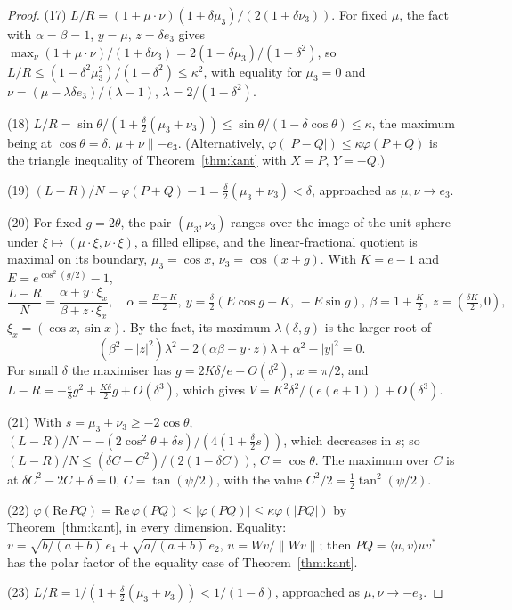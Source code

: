 \documentclass[11pt]{article}
\renewcommand{\Re}{\mathrm{Re}\,}
\theoremstyle{plain}
\theoremstyle{definition}
\theoremstyle{remark}
\begin{document}
\begin{proof}
(17) $L/R=(1+\mu\cdot\nu)(1+\delta\mu_3)/(2(1+\delta\nu_3))$. For fixed $\mu$, the fact with $\alpha=\beta=1$, $y=\mu$,
$z=\delta e_3$ gives $\max_\nu(1+\mu\cdot\nu)/(1+\delta\nu_3)=2(1-\delta\mu_3)/(1-\delta^2)$, so
$L/R\le(1-\delta^2\mu_3^2)/(1-\delta^2)\le\kappa^2$, with equality for $\mu_3=0$ and $\nu=(\mu-\lambda\delta e_3)/(\lambda-1)$,
$\lambda=2/(1-\delta^2)$.

(18) $L/R=\sin\theta/(1+\frac\delta2(\mu_3+\nu_3))\le\sin\theta/(1-\delta\cos\theta)\le\kappa$, the maximum being at
$\cos\theta=\delta$, $\mu+\nu\parallel-e_3$. (Alternatively, $\varphi(|P-Q|)\le\kappa\varphi(P+Q)$ is the triangle inequality
of Theorem~\ref{thm:kant} with $X=P$, $Y=-Q$.)

(19) $(L-R)/N=\varphi(P+Q)-1=\frac\delta2(\mu_3+\nu_3)<\delta$, approached as $\mu,\nu\to e_3$.

(20) For fixed $g=2\theta$, the pair $(\mu_3,\nu_3)$ ranges over the image of the unit sphere under $\xi\mapsto(\mu\cdot
\xi,\nu\cdot\xi)$, a filled ellipse, and the linear-fractional quotient is maximal on its boundary, $\mu_3=\cos x$,
$\nu_3=\cos(x+g)$. With $K=e-1$ and $E=e^{\cos^2(g/2)}-1$,
\[
  \frac{L-R}N=\frac{\alpha+y\cdot\xi_x}{\beta+z\cdot\xi_x},\quad \alpha=\tfrac{E-K}2,\ y=\tfrac\delta2(E\cos g-K,\,-E\sin g),
  \ \beta=1+\tfrac K2,\ z=(\tfrac{\delta K}2,0),
\]
$\xi_x=(\cos x,\sin x)$. By the fact, its maximum $\lambda(\delta,g)$ is the larger root of
\begin{equation}\label{eq:quad}
  (\beta^2-|z|^2)\lambda^2-2(\alpha\beta-y\cdot z)\lambda+\alpha^2-|y|^2=0 .
\end{equation}
For small $\delta$ the maximiser has $g=2K\delta/e+O(\delta^2)$, $x=\pi/2$, and $L-R=-\frac e8g^2+\frac{K\delta}2g+O(\delta^3)$,
which gives $V=K^2\delta^2/(e(e+1))+O(\delta^3)$.

(21) With $s=\mu_3+\nu_3\ge-2\cos\theta$, $(L-R)/N=-(2\cos^2\theta+\delta s)/(4(1+\frac\delta2s))$, which decreases in $s$;
so $(L-R)/N\le(\delta C-C^2)/(2(1-\delta C))$, $C=\cos\theta$. The maximum over $C$ is at $\delta C^2-2C+\delta=0$,
$C=\tan(\psi/2)$, with the value $C^2/2=\frac12\tan^2(\psi/2)$.

(22) $\varphi(\Re PQ)=\Re\varphi(PQ)\le|\varphi(PQ)|\le\kappa\varphi(|PQ|)$ by Theorem~\ref{thm:kant}, in every dimension.
Equality: $v=\sqrt{b/(a+b)}\,e_1+\sqrt{a/(a+b)}\,e_2$, $u=Wv/\|Wv\|$; then $PQ=\langle u,v\rangle uv^*$ has the polar factor
of the equality case of Theorem~\ref{thm:kant}.

(23) $L/R=1/(1+\frac\delta2(\mu_3+\nu_3))<1/(1-\delta)$, approached as $\mu,\nu\to-e_3$.


\end{proof}
\end{document}
